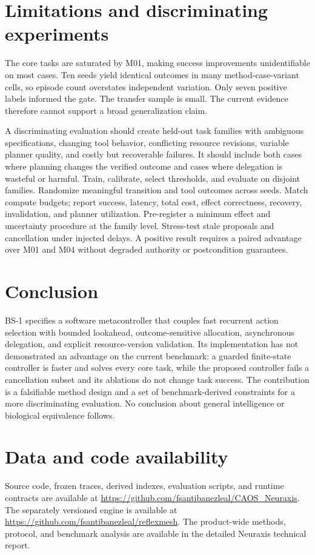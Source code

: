 \documentclass[11pt]{article}
\begin{document}
\section{Limitations and discriminating experiments}
The core tasks are saturated by M01, making success improvements unidentifiable on most cases. Ten seeds yield identical outcomes in many method-case-variant cells, so episode count overstates independent variation. Only seven positive labels informed the gate. The transfer sample is small. The current evidence therefore cannot support a broad generalization claim.

A discriminating evaluation should create held-out task families with ambiguous specifications, changing tool behavior, conflicting resource revisions, variable planner quality, and costly but recoverable failures. It should include both cases where planning changes the verified outcome and cases where delegation is wasteful or harmful. Train, calibrate, select thresholds, and evaluate on disjoint families. Randomize meaningful transition and tool outcomes across seeds. Match compute budgets; report success, latency, total cost, effect correctness, recovery, invalidation, and planner utilization. Pre-register a minimum effect and uncertainty procedure at the family level. Stress-test stale proposals and cancellation under injected delays. A positive result requires a paired advantage over M01 and M04 without degraded authority or postcondition guarantees.

\section{Conclusion}
BS-1 specifies a software metacontroller that couples fast recurrent action selection with bounded lookahead, outcome-sensitive allocation, asynchronous delegation, and explicit resource-version validation. Its implementation has not demonstrated an advantage on the current benchmark: a guarded finite-state controller is faster and solves every core task, while the proposed controller fails a cancellation subset and its ablations do not change task success. The contribution is a falsifiable method design and a set of benchmark-derived constraints for a more discriminating evaluation. No conclusion about general intelligence or biological equivalence follows.

\section*{Data and code availability}
Source code, frozen traces, derived indexes, evaluation scripts, and runtime contracts are available at \url{https://github.com/fsantibanezleal/CAOS_Neuraxis}. The separately versioned engine is available at \url{https://github.com/fsantibanezleal/reflexmesh}. The product-wide methods, protocol, and benchmark analysis are available in the detailed Neuraxis technical report.
\end{document}

